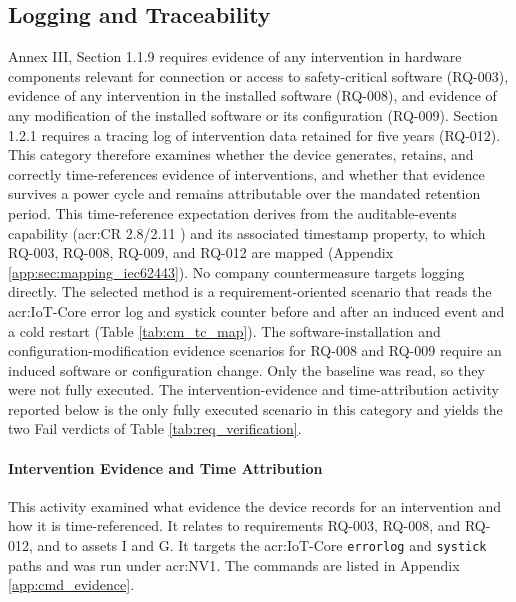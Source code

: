 \subsection{Logging and Traceability}
\label{subsec:cat_logging}
Annex III, Section 1.1.9 requires evidence of any intervention in hardware components relevant for connection or access to safety-critical software (RQ-003), evidence of any intervention in the installed software (RQ-008), and evidence of any modification of the installed software or its configuration (RQ-009). Section 1.2.1 requires a tracing log of intervention data retained for five years (RQ-012). This category therefore examines whether the device generates, retains, and correctly time-references evidence of interventions, and whether that evidence survives a power cycle and remains attributable over the mandated retention period. This time-reference expectation derives from the auditable-events capability (\gls{acr:CR} 2.8/2.11 \cite[p. 47, p. 49]{IEC62443-4-2}) and its associated timestamp property, to which RQ-003, RQ-008, RQ-009, and RQ-012 are mapped (Appendix \ref{app:sec:mapping_iec62443}). No company countermeasure targets logging directly. The selected method is a requirement-oriented scenario that reads the \gls{acr:IoT}-Core error log and systick counter before and after an induced event and a cold restart (Table \ref{tab:cm_tc_map}). The software-installation and configuration-modification evidence scenarios for RQ-008 and RQ-009 require an induced software or configuration change. Only the baseline was read, so they were not fully executed. The intervention-evidence and time-attribution activity reported below is the only fully executed scenario in this category and yields the two Fail verdicts of Table \ref{tab:req_verification}.

\paragraph{Intervention Evidence and Time Attribution}
\label{subsec:res_evidence}
This activity examined what evidence the device records for an intervention and how it is time-referenced. It relates to requirements RQ-003, RQ-008, and RQ-012, and to assets I and G. It targets the \gls{acr:IoT}-Core \texttt{errorlog} and \texttt{systick} paths and was run under \gls{acr:NV1}. The commands are listed in Appendix \ref{app:cmd_evidence}.

